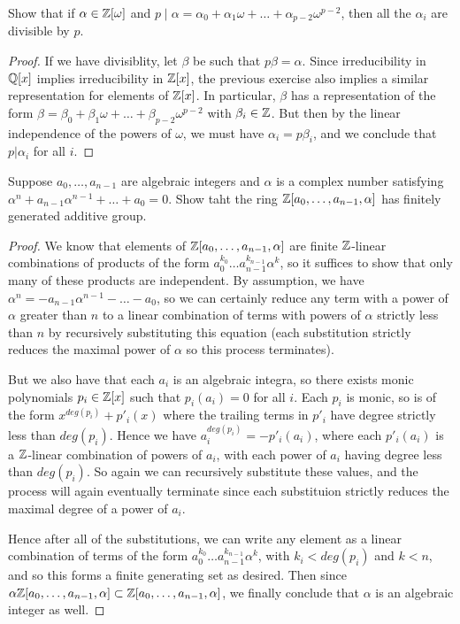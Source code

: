 \documentclass[11pt]{article}
\begin{document}
  
Show that if $\alpha \in \mathbb{Z}[\omega]$ and $p \mid \alpha = \alpha_0 + \alpha_1\omega + \dots + \alpha_{p-2}\omega^{p-2}$, then all the $\alpha_i$ are divisible by $p$.

\begin{proof}
  If we have divisiblity, let $\beta$ be such that $p\beta = \alpha$.
  Since irreducibility in $\mathbb{Q}[x]$ implies irreducibility in $\mathbb{Z}[x]$, the previous exercise also implies a similar representation for elements of $\mathbb{Z}[x]$.
  In particular, $\beta$ has a representation of the form $\beta = \beta_0 + \beta_1\omega + \dots + \beta_{p-2}\omega^{p-2}$ with $\beta_i \in \mathbb{Z}$.
  But then by the linear independence of the powers of $\omega$, we must have $\alpha_i = p\beta_i$, and we conclude that $p | \alpha_i$ for all $i$.
\end{proof}

Suppose $a_0, \dots, a_{n-1}$ are algebraic integers and $\alpha$ is a complex number satisfying $\alpha^n + a_{n-1}\alpha^{n-1} + \dots + a_0 = 0$. Show taht the ring $\mathbb{Z}[a_0, \dots, a_{n-1}, \alpha]$ has finitely generated additive group.

\begin{proof}
  We know that elements of $\mathbb{Z}[a_0, \dots, a_{n-1}, \alpha]$ are finite $\mathbb{Z}$-linear combinations of products of the form $a_0^{k_0} \dots a_{n-1}^{k_{n-1}} \alpha^k$, so it suffices to show that only many of these products are independent.
  By assumption, we have $\alpha^n = -a_{n-1}\alpha^{n-1} - \dots - a_0$, so we can certainly reduce any term with a power of $\alpha$ greater than $n$ to a linear combination of terms with powers of $\alpha$ strictly less than $n$ by recursively substituting this equation (each substitution strictly reduces the maximal power of $\alpha$ so this process terminates).

  But we also have that each $a_i$ is an algebraic integra, so there exists monic polynomials $p_i \in \mathbb{Z}[x]$ such that $p_i(a_i) = 0$ for all $i$.
  Each $p_i$ is monic, so is of the form $x^{deg(p_i)} + p'_i(x)$ where the trailing terms in $p'_i$ have degree strictly less than $deg(p_i)$.
  Hence we have $a_i^{deg(p_i)} = - p'_i(a_i)$, where each $p'_i(a_i)$ is a $\mathbb{Z}$-linear combination of powers of $a_i$, with each power of $a_i$ having degree less than $deg(p_i)$.
  So again we can recursively substitute these values, and the process will again eventually terminate since each substituion strictly reduces the maximal degree of a power of $a_i$.

  Hence after all of the substitutions, we can write any element as a linear combination of terms of the form $a_0^{k_0} \dots a_{n-1}^{k_{n-1}} \alpha^k$, with $k_i < deg(p_i)$ and $k < n$, and so this forms a finite generating set as desired.
  Then since $\alpha \mathbb{Z}[a_0, \dots, a_{n-1}, \alpha] \subset \mathbb{Z}[a_0, \dots, a_{n-1}, \alpha]$, we finally conclude that $\alpha$ is an algebraic integer as well.
\end{proof}
\end{document}
